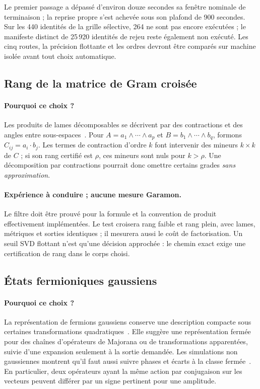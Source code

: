 \documentclass[11pt,a4paper]{article}
\begin{document}
Le premier passage a dépassé d'environ douze secondes sa fenêtre
nominale de terminaison ; la reprise propre s'est achevée sous son
plafond de 900 secondes. Sur les 440 identités de la grille sélective,
264 ne sont pas encore exécutées ; le manifeste distinct de
25\,920 identités de rejeu reste également non exécuté. Les cinq
routes, la précision flottante et les ordres devront être comparés
sur machine isolée avant tout choix automatique.

\FloatBarrier
\subsection{Rang de la matrice de Gram croisée}
\paragraph{Pourquoi ce choix ?}
Les produits de lames décomposables se décrivent par des contractions et
des angles entre sous-espaces~\cite{mandolesi}. Pour
$A=a_1\wedge\cdots\wedge a_p$ et
$B=b_1\wedge\cdots\wedge b_q$, formons
$C_{ij}=a_i\cdot b_j$. Les termes de contraction d'ordre $k$ font
intervenir des mineurs $k\times k$ de $C$ ; si son rang certifié est
$\rho$, ces mineurs sont nuls pour $k>\rho$. Une décomposition par
contractions pourrait donc omettre certains grades \emph{sans approximation}.

\paragraph{Expérience à conduire ; aucune mesure Garamon.}
Le filtre doit être prouvé pour la formule et la convention de produit
effectivement implémentées. Le test croisera rang faible et rang plein,
avec lames, métriques et sorties identiques ; il mesurera aussi le coût
de factorisation. Un seuil SVD flottant n'est qu'une décision approchée :
le chemin exact exige une certification de rang dans le corps choisi.

\subsection{États fermioniques gaussiens}
\paragraph{Pourquoi ce choix ?}
La représentation de fermions gaussiens conserve une description compacte
sous certaines transformations quadratiques~\cite{bravyigaussian}.
Elle suggère une représentation fermée pour des chaînes d'opérateurs de
Majorana ou de transformations apparentées, suivie d'une expansion seulement
à la sortie demandée. Les simulations non gaussiennes montrent qu'il faut
aussi suivre phases et écarts à la classe fermée~\cite{dias}.
En particulier, deux opérateurs ayant la même action par conjugaison sur
les vecteurs peuvent différer par un signe pertinent pour une amplitude.
\end{document}
